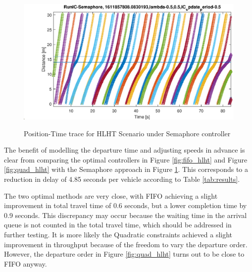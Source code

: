 \begin{figure}
\includegraphics[width=1.0\linewidth]{results_fig/IC-Semaphore-HLHT.eps}
\label{fig:sema_hlht}
\caption{Position-Time trace for HLHT Scenario under Semaphore controller}
\end{figure}
The benefit of modelling the departure time and adjusting speeds in advance is clear from comparing the optimal controllers in Figure \ref{fig:fifo_hlht} and Figure \ref{fig:quad_hlht} with the Semaphore approach in Figure \ref{fig:sema_hlht}. This corresponds to a reduction in delay of 4.85 seconds per vehicle according to Table \ref{tab:results}. 

The two optimal methods are very close, with FIFO achieving a slight improvement in total travel time of 0.6 seconds, but a lower completion time by 0.9 seconds. This discrepancy may occur because the waiting time in the arrival queue is not counted in the total travel time, which should be addressed in further testing. It is more likely the Quadratic constraints achieved a slight improvement in throughput because of the freedom to vary the departure order. However, the departure order in Figure \ref{fig:quad_hlht} turns out to be close to FIFO anyway.

